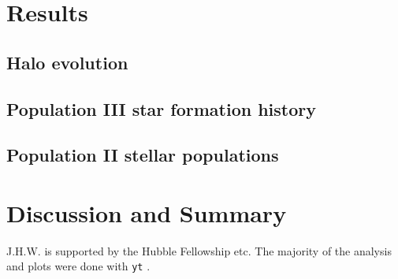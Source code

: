 \documentclass[apjl]{emulateapj}
\begin{document}
\section{Results}
\label{sec:results}

\subsection{Halo evolution}

\subsection{Population III star formation history}

\subsection{Population II stellar populations}

\section{Discussion and Summary}

\acknowledgments

J.H.W. is supported by the Hubble Fellowship etc.  The majority of the
analysis and plots were done with \texttt{yt} \citep{yt}.

%

\end{document}
